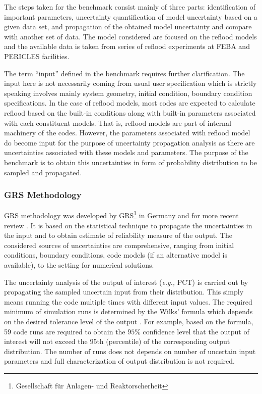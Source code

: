 \documentclass[11pt,titlepage]{article}
\begin{document}
The steps taken for the benchmark consist mainly of three parts: identification of important parameters, uncertainty quantification of model uncertainty based on a given data set, and propagation of the obtained model uncertainty and compare with another set of data. 
The model considered are focused on the reflood models and the available data is taken from series of reflood experiments at FEBA and PERICLES facilities.

The term ``input'' defined in the benchmark requires further clarification. 
The input here is not necessarily coming from usual user specification which is strictly speaking involves mainly system geometry, initial condition, boundary condition specifications. 
In the case of reflood models, most codes are expected to calculate reflood based on the built-in conditions along with built-in parameters associated with each constituent models. 
That is, reflood models are part of internal machinery of the codes. 
However, the parameters associated with reflood model do become input for the purpose of uncertainty propagation analysis as there are uncertainties associated with these models and parameters. 
The purpose of the benchmark is to obtain this uncertainties in form of probability distribution to be sampled and propagated. 

\subsubsection{GRS Methodology}

GRS methodology was developed by GRS\footnote{Gesellschaft f\"ur Anlagen- und Reaktorscherheit} in Germany \cite{Glaeser1994} and for more recent review \cite{Glaeser2008}. 
It is based on the statistical technique to propagate the uncertainties in the input and to obtain estimate of reliability measure of the output. 
The considered sources of uncertainties are comprehensive, ranging from initial conditions, boundary conditions, code models (if an alternative model is available), to the setting for numerical solutions.

The uncertainty analysis of the output of interest (\textit{e.g.,} PCT) is carried out by propagating the sampled uncertain input from their distribution. 
This simply means running the code multiple times with different input values. 
The required minimum of simulation runs is determined by the Wilks' formula \cite{Wilks1942} which depends on the desired tolerance level of the output \cite{Glaeser2008}. 
For example, based on the formula, 59 code runs are required to obtain the $95\%$ confidence level that the output of interest will not exceed the $95$th (percentile) of the corresponding output distribution.
The number of runs does not depends on number of uncertain input parameters and full characterization of output distribution is not required.
\end{document}
